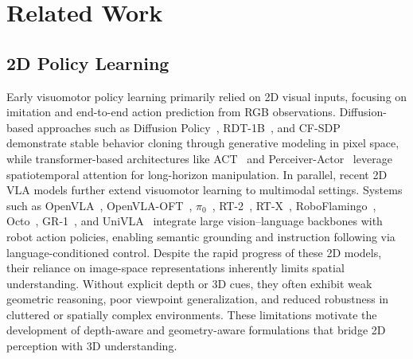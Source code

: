 \documentclass[runningheads]{llncs}
\begin{document}
\section{Related Work}

\label{sec:related}

\subsection{2D Policy Learning}
Early visuomotor policy learning primarily relied on 2D visual inputs, focusing on imitation and end-to-end action prediction from RGB observations. Diffusion-based approaches such as Diffusion Policy~\cite{chi2024diffusionpolicyvisuomotorpolicy},  RDT-1B~\cite{liu2025rdt1bdiffusionfoundationmodel}, and CF-SDP~\cite{yu2025efficienttaskspecificconditionaldiffusion} demonstrate stable behavior cloning through generative modeling in pixel space, while transformer-based architectures like ACT~\cite{zhao2023learning} and Perceiver-Actor~\cite{shridhar2022perceiveractormultitasktransformerrobotic} leverage spatiotemporal attention for long-horizon manipulation.  
In parallel, recent 2D VLA models further extend visuomotor learning to multimodal settings. Systems such as OpenVLA~\cite{kim2024openvla}, OpenVLA-OFT~\cite{kim2025fine}, $\pi_0$~\cite{black2024pi_0}, RT-2~\cite{zitkovich2023rt}, RT-X~\cite{o2024open}, RoboFlamingo~\cite{li2023vision}, Octo~\cite{team2024octo}, GR-1~\cite{wu2023unleashing}, and UniVLA~\cite{bu2025univla} integrate large vision–language backbones with robot action policies, enabling semantic grounding and instruction following via language-conditioned control. 
Despite the rapid progress of these 2D models, their reliance on image-space representations inherently limits spatial understanding. Without explicit depth or 3D cues, they often exhibit weak geometric reasoning, poor viewpoint generalization, and reduced robustness in cluttered or spatially complex environments. These limitations motivate the development of depth-aware and geometry-aware formulations that bridge 2D perception with 3D understanding.

\vspace{-0.06em}
\end{document}
